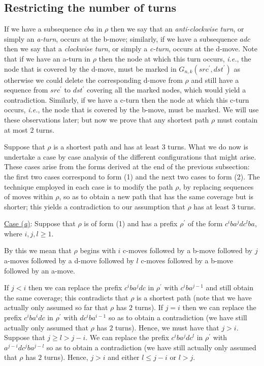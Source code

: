 \documentclass{article}
\newcounter{fig}
\begin{document}
\subsection{Restricting the number of turns} \label{sec:turns}

If we have a subsequence $cba$ in $\rho$ then we say that an \emph{anti-clockwise turn}, or simply an \emph{a-turn}, occurs at the b-move; similarly, if we have a subsequence $adc$ then we say that a \emph{clockwise turn}, or simply a \emph{c-turn}, occurs at the d-move. Note that if we have an a-turn in $\rho$ then the node at which this turn occurs, \emph{i.e.}, the node that is covered by the d-move, must be marked in $G_{n,k}(src^\prime,dst^\prime)$ as otherwise we could delete the corresponding d-move from $\rho$ and still have a sequence from $src^\prime$ to $dst^\prime$ covering all the marked nodes, which would yield a contradiction. Similarly, if we have a c-turn then the node at which this c-turn occurs, \emph{i.e.}, the node that is covered by the b-move, must be marked. We will use these observations later; but now we prove that any shortest path $\rho$ must contain at most $2$ turns. 

Suppose that $\rho$ is a shortest path and has at least $3$ turns. What we do now is undertake a case by case analysis of the different configurations that might arise. These cases arise from the forms derived at the end of the previous subsection: the first two cases correspond to form (1) and the next two cases to form (2). The technique employed in each case is to modify the path $\rho$, by replacing sequences of moves within $\rho$, so as to obtain a new path that has the same coverage but is shorter; this yields a contradiction to our assumption that $\rho$ has at least $3$ turns.\smallskip

\noindent\underline{Case (\emph{a\/})}: Suppose that $\rho$ is of form (1) and has a prefix $\rho^\prime$ of the form $c^iba^jdc^lba$, where $i,j,l\geq 1$.\smallskip

\noindent By this we mean that $\rho$ begins with $i$ c-moves followed by a b-move followed by $j$ a-moves followed by a d-move followed by $l$ c-moves followed by a b-move followed by an a-move. 

If $j < i$ then we can replace the prefix $c^iba^jdc$ in $\rho^\prime$ with $c^iba^{j-1}$ and still obtain the same coverage; this contradicts that $\rho$ is a shortest path (note that we have actually only assumed so far that $\rho$ has $2$ turns). If $j=i$ then we can replace the prefix $c^iba^idc$ in $\rho^\prime$ with $dc^iba^{i-1}$ so as to obtain a contradiction (we have still actually only assumed that $\rho$ has $2$ turns). Hence, we must have that $j> i$. Suppose that $j\geq l > j-i$. We can replace the prefix $c^iba^jdc^l$ in $\rho^\prime$ with $a^{j-i}dc^jba^{j-l}$ so as to obtain a contradiction (we have still actually only assumed that $\rho$ has $2$ turns). Hence, $j>i$ and either $l \leq j-i$ or $l > j$. 
\end{document}
